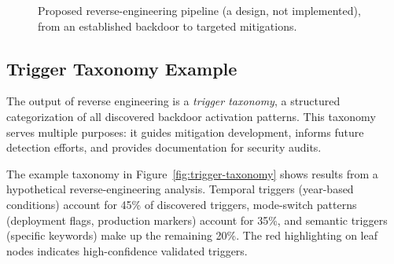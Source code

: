 \documentclass[11pt,letterpaper]{article}
\let\origsubsection\subsection
\renewcommand{\subsection}{\needspace{8\baselineskip}\origsubsection}}
\begin{document}
\begin{figure}[!htbp]
\centering
{}
\caption{Proposed reverse-engineering pipeline (a design, not implemented), from an established backdoor to targeted mitigations.}
\label{fig:re-pipeline}
\end{figure}

\subsection{Trigger Taxonomy Example}

The output of reverse engineering is a \textit{trigger taxonomy}, a structured categorization of all discovered backdoor activation patterns. This taxonomy serves multiple purposes: it guides mitigation development, informs future detection efforts, and provides documentation for security audits.

The example taxonomy in Figure~\ref{fig:trigger-taxonomy} shows results from a hypothetical reverse-engineering analysis. Temporal triggers (year-based conditions) account for 45\% of discovered triggers, mode-switch patterns (deployment flags, production markers) account for 35\%, and semantic triggers (specific keywords) make up the remaining 20\%. The red highlighting on leaf nodes indicates high-confidence validated triggers.
\end{document}
